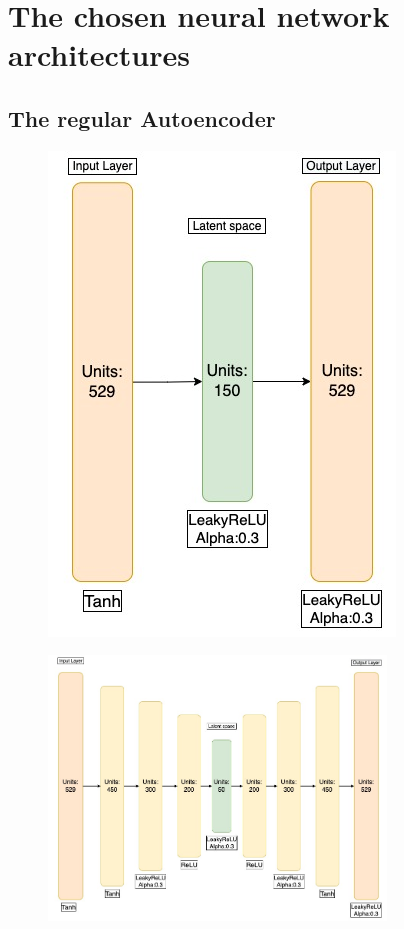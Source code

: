 \section*{The chosen neural network architectures}

\subsection*{The regular Autoencoder}


\begin{figure}[h!]
    \centering
    \includegraphics[scale=0.5]{Figures/nnarchitect/ae_small.jpeg}
    \caption{ }
    \label{fig:ae_small}
\end{figure}

\begin{figure}[h!]
    \centering
    \includegraphics[width=0.8\textwidth]{Figures/nnarchitect/ae_big.jpeg}
    \caption{ }
    \label{fig:ae_big}
\end{figure}




